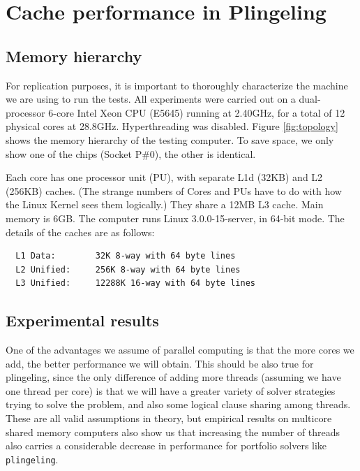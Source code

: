 \documentclass{llncs}
\begin{document}
\section{Cache performance in Plingeling}

\subsection{Memory hierarchy}
\label{sec:memhier}

For replication purposes, it is important to thoroughly characterize
the machine we are using to run the tests. All experiments were
carried out on a dual-processor 6-core Intel Xeon CPU (E5645) running
at 2.40GHz, for a total of 12 physical cores at
28.8GHz. Hyperthreading was disabled. Figure \ref{fig:topology} shows
the memory hierarchy of the testing computer. To save space, we only
show one of the chips (Socket P\#0), the other is identical.


Each core has one processor unit (PU), with separate L1d (32KB) and L2
(256KB) caches. (The strange numbers of Cores and PUs have to do with
how the Linux Kernel sees them logically.) They share a 12MB L3
cache. Main memory is 6GB. The computer runs Linux 3.0.0-15-server, in
64-bit mode. The details of the caches are as follows:

\small
\begin{verbatim}
  L1 Data:        32K 8-way with 64 byte lines
  L2 Unified:     256K 8-way with 64 byte lines
  L3 Unified:     12288K 16-way with 64 byte lines
\end{verbatim}
\normalsize

\subsection{Experimental results}

One of the advantages we assume of parallel computing is that the more
cores we add, the better performance we will obtain. This should be
also true for plingeling, since the only difference of adding more
threads (assuming we have one thread per core) is that we will have a
greater variety of solver strategies trying to solve the problem, and
also some logical clause sharing among threads. These are all valid
assumptions in theory, but empirical results on multicore shared
memory computers also show us that increasing the number of threads
also carries a considerable decrease in performance for portfolio
solvers like {\tt plingeling}.
\end{document}
